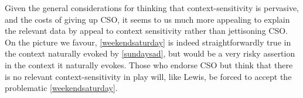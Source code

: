 \documentclass[If.tex]{subfiles}
\begin{document}
\begin{comment}
Those who would deny the validity of the above principles could try to fall back on the idea that they are at least quasi-valid, or have some other positive status of an epistemic sort, for example being such that if one were rationally certain of the premises, one would be entitled to be certain of the conclusion. But the challenges to such an approach are formidable. For one thing, the badness of the relevant speeches does not disappear under ‘Maybe’ or ‘Perhaps’ or ‘For all I know’. For example, the following speech is still terrible: ‘For all I know, he would have gone with Jane and had a good time if he had gone to the party, but wouldn't have had a good time if he had gone to the party with Jane’. We could also consider quantified speeches like ‘Two of those three people would have brought guests and had a great time, if they had gone to the party, but only one of them would have had a great time if they had brought a guest to the party’. \textbf{This isn't doing much for us right now---cut or expand?}
\end{comment}

Given the general considerations for thinking that context-sensitivity is pervasive, and the costs of giving up CSO, it seems to us much more appealing to explain the relevant data by appeal to context sensitivity rather than jettisoning CSO. On the picture we favour, \ref{weekendsaturday} is indeed straightforwardly true in the context naturally evoked by \ref{sundaysad}, but would be a very risky assertion in the context it naturally evokes. Those who endorse CSO but think that there is no relevant context-sensitivity in play will, like Lewis, be forced to accept the problematic \ref{weekendsaturday}.
\end{document}
